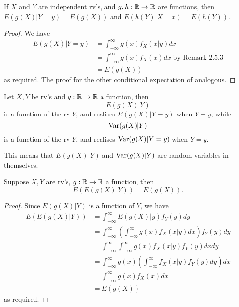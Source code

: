 \documentclass[11pt,fleqn]{book} %
\begin{document}
\begin{theorem} If \(X\) and \(Y\) are independent rv's, and \(g, h:\mathbb{R}\rightarrow\mathbb{R}\) are functions, then \(E(g(X)|Y = y) = E(g(X))\) and \(E(h(Y)|X = x) = E(h(Y))\).
\end{theorem}
\begin{proof} We have
\[
\begin{aligned}
E(g(X)|Y = y) &= \int_{-\infty}^\infty g(x)f_X(x|y)dx \\
&= \int_{-\infty}^\infty g(x)f_X(x)dx \text{ by Remark 2.5.3} \\
&= E(g(X))
\end{aligned}
\]
as required. The proof for the other conditional expectation of analogous.
\end{proof}

\begin{definition} 
Let \(X, Y\) be rv's and \(g:\mathbb{R}\rightarrow\mathbb{R}\) a function, then
\[
E(g(X)|Y)
\]
is a function of the rv \(Y\), and realises \(E(g(X)|Y = y)\) when \(Y = y\), while
\[
\operatorname{Var}(g(X)|Y)
\]
is a function of the rv \(Y\), and realises \(\operatorname{Var}(g(X)|Y = y)\) when \(Y = y\).
\end{definition}

\begin{remark}
This means that \(E(g(X)|Y)\) and \(\operatorname{Var}(g(X)|Y)\) are random variables in themselves.
\end{remark}

\begin{theorem}
\label{thm:276}
Suppose \(X, Y\) are rv's, \(g:\mathbb{R}\rightarrow\mathbb{R}\) a function, then
\[
E(E(g(X)|Y)) = E(g(X)).
\]
\end{theorem}
\begin{proof}
Since \(E(g(X)|Y)\) is a function of \(Y\), we have
\[
\begin{aligned}
E(E(g(X)|Y)) &= \int_{-\infty}^\infty E(g(X)|y)f_Y(y)dy \\
&= \int_{-\infty}^\infty\left(\int_{-\infty}^\infty g(x)f_X(x|y)dx\right)f_Y(y)dy \\
&= \int_{-\infty}^\infty\int_{-\infty}^\infty g(x)f_X(x|y)f_Y(y) dxdy \\
&= \int_{-\infty}^\infty g(x)\left(\int_{-\infty}^\infty f_X(x|y) f_Y(y)dy\right)dx \\
&= \int_{-\infty}^\infty g(x)f_X(x) dx \\
&= E(g(X))
\end{aligned}
\]
as required.
\end{proof}
\end{document}
